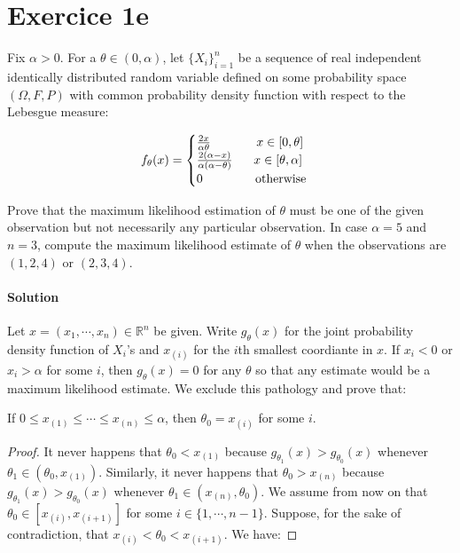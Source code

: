 \documentclass[../main.tex]{subfiles}
\begin{document}
\section{Exercice 1e}
\begin{CJK*}{UTF8}{gbsn}
Fix $\alpha > 0$. For a $\theta \in (0, \alpha)$,
let $\{X_i\}_{i=1}^n$ be a sequence of real independent identically distributed random variable 
defined on some probability space $(\Omega, F, P)$
with common probability density function with respect to the Lebesgue measure:

\begin{equation*}
    f_{\theta}(x) = 
    \begin{cases}
        \frac{2x}{\alpha \theta} \tab[1.3cm] x \in [0, \theta] \\
        \frac{2(\alpha-x)}{\alpha(\alpha - \theta)} \tab[0.6cm] x \in [\theta, \alpha] \\
        0 \tab[1.5cm] \text{otherwise}
    \end{cases}
\end{equation*}

Prove that the maximum likelihood estimation of $\theta$ must be one of the given observation
but not necessarily any particular observation. 
In case $\alpha = 5$ and $n=3$, compute the maximum likelihood estimate of $\theta$ when the 
observations are $(1,2,4)$ or $(2,3,4)$.  

\smallskip
\paragraph{Solution}
Let $x = (x_1, \cdots, x_n) \in \mathbb{R}^n$ be given. 
Write $g_{\theta}(x)$ for the joint probability density function of $X_i$'s 
and $x_{(i)}$ for the $i$th smallest coordiante in $x$.
If $x_i < 0$ or $x_i > \alpha$ for some $i$, then $g_{\theta}(x)=0$ for any $\theta$ so that 
any estimate would be a maximum likelihood estimate.
We exclude this pathology and prove that:

\begin{theorem}
If $0 \leqslant x_{(1)} \leqslant \cdots \leqslant x_{(n)} \leqslant \alpha$, then $\theta_0 = x_{(i)}$ for some $i$.
\end{theorem}

\begin{proof}
It never happens that $\theta_0 < x_{(1)}$
because $g_{\theta_1}(x) > g_{\theta_0}(x)$ whenever $\theta_1 \in (\theta_0,x_{(1)})$.
Similarly, it never happens that $\theta_0 > x_{(n)}$ because
$g_{\theta_1}(x) > g_{\theta_0}(x)$ whenever $\theta_1 \in (x_{(n)}, \theta_0)$.
We assume from now on that $\theta_0 \in [x_{(i)}, x_{(i+1)}]$ for some $i \in \{1,\cdots, n-1\}$.
Suppose, for the sake of contradiction, that $x_{(i)} < \theta_0 < x_{(i+1)}$. We have:


\end{proof}
\end{CJK*}
\end{document}
